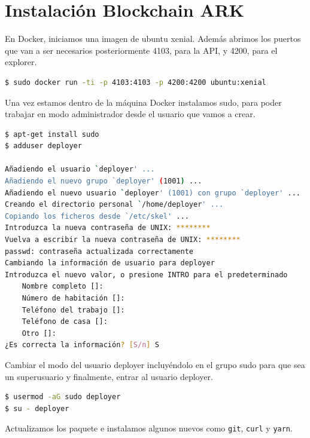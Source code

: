 \section{Instalación Blockchain ARK}

En Docker, iniciamos una imagen de ubuntu xenial. Además abrimos los puertos que van a ser necesarios posteriormente 4103, para la API, y 4200, para el explorer.\\

\begin{lstlisting}[language=Bash,caption=Instalación Blockchain. Parte I, label=cod:suma-cuerpo, style=Consola]
$ sudo docker run -ti -p 4103:4103 -p 4200:4200 ubuntu:xenial
\end{lstlisting}

Una vez estamos dentro de la máquina Docker instalamos sudo, para poder trabajar en modo administrador desde el usuario que vamos a crear.\\

\begin{lstlisting}[language=Bash,caption=Instalación Blockchain. Parte II, label=cod:suma-cuerpo, style=Consola]
$ apt-get install sudo
$ adduser deployer

Añadiendo el usuario `deployer' ...
Añadiendo el nuevo grupo `deployer' (1001) ...
Añadiendo el nuevo usuario `deployer' (1001) con grupo `deployer' ...
Creando el directorio personal `/home/deployer' ...
Copiando los ficheros desde `/etc/skel' ...
Introduzca la nueva contraseña de UNIX: ********
Vuelva a escribir la nueva contraseña de UNIX: ********
passwd: contraseña actualizada correctamente
Cambiando la información de usuario para deployer
Introduzca el nuevo valor, o presione INTRO para el predeterminado
	Nombre completo []: 
	Número de habitación []: 
	Teléfono del trabajo []: 
	Teléfono de casa []: 
	Otro []: 
¿Es correcta la información? [S/n] S
\end{lstlisting}

Cambiar el modo del usuario deployer incluyéndolo en el grupo sudo para que sea un superusuario y finalmente, entrar al usuario deployer.\\

\begin{lstlisting}[language=Bash,caption=Instalación Blockchain. Parte III, label=cod:suma-cuerpo, style=Consola]
$ usermod -aG sudo deployer
$ su - deployer
\end{lstlisting}

Actualizamos los paquete e instalamos algunos nuevos como \texttt{git}, \texttt{curl} y \texttt{yarn}.\\

